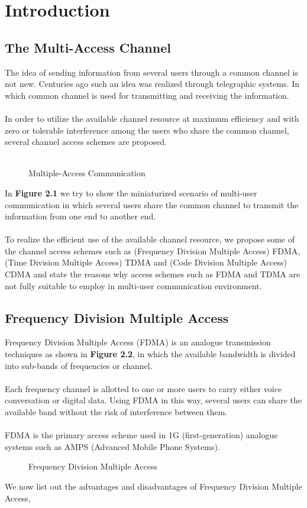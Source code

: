\chapter{Introduction}
\section{The Multi-Access Channel}
The idea of sending information from several users through a common channel is not new. Centuries ago such an idea was realized through telegraphic systems. In which common channel is used for transmitting and receiving the information. \\ \\
In order to utilize the available channel resource at maximum efficiency and with zero or tolerable interference among the users who share the common channel, several channel access schemes are proposed. \\ \\
\begin{figure}[htb]
  \centerline{  }
  \caption{Multiple-Access Communication}
\end{figure}
In \textbf{Figure 2.1} we try to show the miniaturized scenario of multi-user communication in which several users share the common channel to transmit the information from one end to another end. \\ \\
To realize the efficient use of the available channel resource, we propose some of the channel access schemes such as (Frequency Division Multiple Access) FDMA, (Time Division Multiple Access) TDMA and (Code Division Multiple Access) CDMA and state the reasons why access schemes such as FDMA and TDMA are not fully suitable to employ in multi-user communication environment.
\section{Frequency Division Multiple Access}
Frequency Division Multiple Access (FDMA) is an analogue transmission techniques as shown in \textbf{Figure 2.2}, in which the available bandwidth is divided into sub-bands of frequencies or channel. \\ \\
Each frequency channel is allotted to one or more users to carry either voice conversation or digital data. Using FDMA in this way, several users can share the available band without the risk of interference between them. \\ \\
FDMA is the primary access scheme used in 1G (first-generation) analogue systems such as AMPS (Advanced Mobile Phone Systems).
\begin{figure}[htb]
  \centerline{  }
  \caption{Frequency Division Multiple Access}
\end{figure}
We now list out the advantages and disadvantages of Frequency Division Multiple Access,
